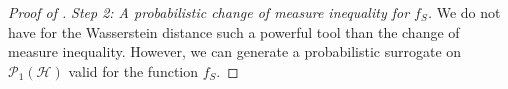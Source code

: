 \begin{proof}[Proof of ]
\textit{Step 2: A probabilistic change of measure inequality for $f_S$.}
We do not have for the Wasserstein distance such a powerful tool than the change of measure inequality. However, we can generate a probabilistic surrogate on $\mathcal{P}_1(\mathcal{H})$ valid for the function $f_S$.



\end{proof}
